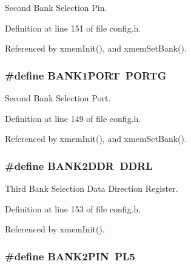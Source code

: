 Second Bank Selection Pin. 



Definition at line 151 of file config.\-h.



Referenced by xmem\-Init(), and xmem\-Set\-Bank().

\hypertarget{group__config_ga8b3ee7126196f6e939989eae097c3ac4}{
\subsubsection[{B\-A\-N\-K1\-P\-O\-R\-T}]{\setlength{\rightskip}{0pt plus 5cm}\#define B\-A\-N\-K1\-P\-O\-R\-T~P\-O\-R\-T\-G}}\label{group__config_ga8b3ee7126196f6e939989eae097c3ac4}


Second Bank Selection Port. 



Definition at line 149 of file config.\-h.



Referenced by xmem\-Init(), and xmem\-Set\-Bank().

\hypertarget{group__config_ga62f56230c5f5f7220c44ab1c93d677ab}{
\subsubsection[{B\-A\-N\-K2\-D\-D\-R}]{\setlength{\rightskip}{0pt plus 5cm}\#define B\-A\-N\-K2\-D\-D\-R~D\-D\-R\-L}}\label{group__config_ga62f56230c5f5f7220c44ab1c93d677ab}


Third Bank Selection Data Direction Register. 



Definition at line 153 of file config.\-h.



Referenced by xmem\-Init().

\hypertarget{group__config_ga74c95f6ccdb5e482e97a5af53ed74229}{
\subsubsection[{B\-A\-N\-K2\-P\-I\-N}]{\setlength{\rightskip}{0pt plus 5cm}\#define B\-A\-N\-K2\-P\-I\-N~P\-L5}}\label{group__config_ga74c95f6ccdb5e482e97a5af53ed74229}


